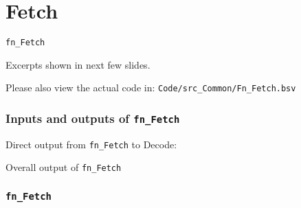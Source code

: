 
\section{Fetch}

\begin{frame}

\begin{center}
  {\LARGE\tt fn\_Fetch}

  \vspace{5ex}

  Excerpts shown in next few slides.

  Please also view the actual code in:
  {\tt Code/src\_Common/Fn\_Fetch.bsv}

\end{center}

\end{frame}


\begin{frame}[fragile]
\frametitle{Inputs and outputs of {\tt fn\_Fetch}}

\footnotesize

Direct output from {\tt fn\_Fetch} to Decode:

\vspace{1ex}


\vspace{5ex}

Overall output of {\tt fn\_Fetch}

\vspace{1ex}


\end{frame}


\begin{frame}
\frametitle{{\tt fn\_Fetch}}

\footnotesize


\end{frame}


